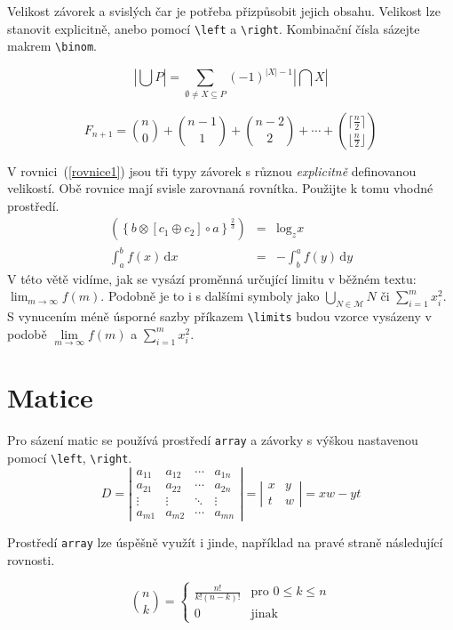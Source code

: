 \documentclass[a4paper, twocolumn, 11pt]{article}
\begin{document}
Velikost závorek a svislých čar je potřeba přizpůsobit jejich obsahu. Velikost lze stanovit explicitně, anebo pomocí \verb|\left| a \verb|\right|. Kombinační čísla sázejte makrem \verb|\binom|.

\begin{equation*}
    \left|\bigcup P\right|=\sum\limits _{\emptyset\neq X\subseteq P}(-1)^{|X|-1}\left|\bigcap X\right|
\end{equation*}

\begin{equation*}
    F_{n+1}=\binom{n}{0}+\binom{n-1}{1}+\binom{n-2}{2}+\cdots+\binom{\lceil\frac{n}{2}\rceil}{\lfloor\frac{n}{2}\rfloor}
\end{equation*}

V rovnici~(\ref{rovnice1}) jsou tři typy závorek s různou \emph{explicitně} definovanou velikostí. Obě rovnice mají svisle zarovnaná rovnítka. Použijte k tomu vhodné prostředí.
\begin{eqnarray}
    \label{rovnice1}\left(\left\{b\otimes[c_1\oplus c_2]\circ a\right\}^{\frac{2}{3}}\right) & = & \mathrm{log}_z x\\
    \label{rovnice2}\int_a^b f(x)\,\mathrm{d}x & = & -\int_b^a f(y)\,\mathrm{d}y
\end{eqnarray}
V této větě vidíme, jak se vysází proměnná určující limitu v běžném textu: $\lim_{m\rightarrow\infty} f(m)$. Podobně je to i s dalšími symboly jako $\bigcup_{N \in \mathcal{M}}N$ či $\sum_{i=1}^m x_i^2$. S vynucením méně úsporné sazby příkazem \verb|\limits| budou vzorce vysázeny v podobě $\lim\limits _{m\rightarrow\infty}f(m)$ a $\sum\limits _{i=1}^m x_i^2$.

\section{Matice}

Pro sázení matic se používá prostředí \texttt{array} a závorky s výškou nastavenou pomocí \verb|\left|, \verb|\right|.
$$D=
\left|
\begin{array}{cccc}
    a_{11} & a_{12} & \cdots & a_{1n}\\
    a_{21} & a_{22} & \cdots & a_{2n}\\
    \vdots & \vdots & \ddots & \vdots\\
    a_{m1} & a_{m2} & \cdots & a_{mn}
\end{array}
\right|
=
\left|
\begin{array}{cc}
    x & y\\
    t & w
\end{array}
\right|
=xw-yt$$

Prostředí \texttt{array} lze úspěšně využít i jinde, například na pravé straně následující rovnosti.

$$\binom{n}{k}=
\left\{
\begin{array}{ll}
    \frac{n!}{k!(n-k)!} & \text{pro } 0\leq k\leq n\\
    0 & \text{jinak}
\end{array}
\right.$$
\end{document}
